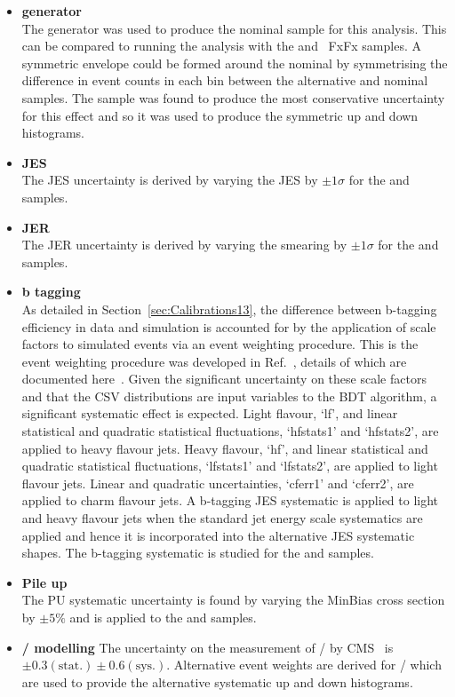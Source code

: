 \begin{itemize}
\item \textbf{\ttbar generator}\\
The \POWHEG generator was used to produce the nominal \ttbar sample for this analysis. This can be compared to running the analysis with the \MLM and \MADGRAPH\aMCATNLO~FxFx \ttbar samples. A symmetric envelope could be formed around the nominal by symmetrising the difference in event counts in each bin between the alternative and nominal samples. The \MLM sample was found to produce the most conservative uncertainty for this effect and so it was used to produce the symmetric up and down histograms.
\item \textbf{JES}\\
The JES uncertainty is derived by varying the JES by $\pm1\sigma$ for the \ttbar and \tttt samples.
\item \textbf{JER}\\
The JER uncertainty is derived by varying the smearing by $\pm1\sigma$ for the \ttbar and \tttt samples.
\item \textbf{b tagging}\\
As detailed in Section~\ref{sec:Calibrations13}, the difference between b-tagging efficiency in data and simulation is accounted for by the application of scale factors to simulated events via an event weighting procedure. This is the event weighting procedure was developed in Ref.~\cite{CMS-PAS-HIG-16-004}, details of which are documented here~\cite{CMS-NOTE-2013-130}. Given the significant uncertainty on these scale factors and that the CSV distributions are input variables to the BDT algorithm, a significant systematic effect is expected. Light flavour, `lf', and linear statistical and quadratic statistical fluctuations, `hfstats1' and `hfstats2', are applied to heavy flavour jets.  Heavy flavour, `hf', and linear statistical and quadratic statistical fluctuations, `lfstats1' and `lfstats2', are applied to light flavour jets. Linear and quadratic uncertainties, `cferr1' and `cferr2', are applied to charm flavour jets. A b-tagging JES systematic is applied to light and heavy flavour jets when the standard jet energy scale systematics are applied and hence it is incorporated into the alternative JES systematic shapes. The b-tagging systematic is studied for the \ttbar and \tttt samples.
\item \textbf{Pile up}\\
The PU systematic uncertainty is found by varying the MinBias cross section by $\pm5\%$ and is applied to the \ttbar and \tttt samples.
\item \textbf{\heavyflavourone / \heavyflavourtwo modelling}
The uncertainty on the measurement of \heavyflavourone / \heavyflavourtwo by CMS~\cite{Khachatryan2015132} is $\pm 0.3 \left( \textrm{stat.} \right) \pm 0.6 \left(\textrm{sys.} \right)$. Alternative event weights are derived for \heavyflavourone / \heavyflavourtwo which are used to provide the alternative systematic up and down histograms.
\end{itemize}
